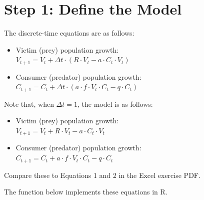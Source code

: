 \documentclass[
  a4paper]{book}
\begin{document}
\section{Step 1: Define the Model}\label{step-1-define-the-model}

The discrete-time equations are as follows:

\begin{itemize}
\item
  Victim (prey) population growth:\\
  \(V_{t+1} = V_t + \Delta t \cdot (R \cdot V_t - a \cdot C_t \cdot V_t)\)
\item
  Consumer (predator) population growth:\\
  \(C_{t+1} = C_t + \Delta t \cdot (a \cdot f \cdot V_t \cdot C_t - q \cdot C_t)\)
\end{itemize}

Note that, when \(\Delta t = 1\), the model is as follows:

\begin{itemize}
\item
  Victim (prey) population growth:\\
  \(V_{t+1} = V_t + R \cdot V_t - a \cdot C_t \cdot V_t\)
\item
  Consumer (predator) population growth:\\
  \(C_{t+1} = C_t + a \cdot f \cdot V_t \cdot C_t - q \cdot C_t\)
\end{itemize}

Compare these to Equations 1 and 2 in the Excel exercise PDF.

The function below implements these equations in R.
\end{document}
